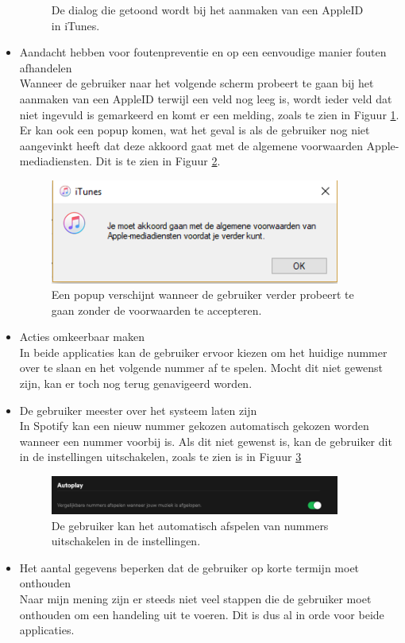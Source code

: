 \documentclass[11pt]{article}
\begin{document}
\begin{itemize}
\begin{figure}
		\caption{De dialog die getoond wordt bij het aanmaken van een AppleID in iTunes.}
		\label{fig:IAppleID}
	\end{figure}
	\item Aandacht hebben voor foutenpreventie en op een eenvoudige manier fouten afhandelen\\
	Wanneer de gebruiker naar het volgende scherm probeert te gaan bij het aanmaken van een AppleID terwijl een veld nog leeg is, wordt ieder veld dat niet ingevuld is gemarkeerd en komt er een melding, zoals te zien in Figuur \ref{fig:IAppleID}. Er kan ook een popup komen, wat het geval is als de gebruiker nog niet aangevinkt heeft dat deze akkoord gaat met de algemene voorwaarden Apple-mediadiensten. Dit is te zien in Figuur \ref{fig:IAppleIDAkkoord}.
	\begin{figure}
		\centering
		\includegraphics[width=0.9\textwidth]{IAppleIDAkkoord.png}
		\caption{Een popup verschijnt wanneer de gebruiker verder probeert te gaan zonder de voorwaarden te accepteren.}
		\label{fig:IAppleIDAkkoord}
	\end{figure}
	\item Acties omkeerbaar maken\\
	In beide applicaties kan de gebruiker ervoor kiezen om het huidige nummer over te slaan en het volgende nummer af te spelen. Mocht dit niet gewenst zijn, kan er toch nog terug genavigeerd worden.
	\item De gebruiker meester over het systeem laten zijn\\
	In Spotify kan een nieuw nummer gekozen automatisch gekozen worden wanneer een nummer voorbij is. Als dit niet gewenst is, kan de gebruiker dit in de instellingen uitschakelen, zoals te zien is in Figuur \ref{fig:SAutoplay}
	\begin{figure}
		\centering
		\includegraphics[width=0.9\textwidth]{SAutoplay.png}
		\caption{De gebruiker kan het automatisch afspelen van nummers uitschakelen in de instellingen.}
		\label{fig:SAutoplay}
	\end{figure}
	\item Het aantal gegevens beperken dat de gebruiker op korte termijn moet onthouden\\
	Naar mijn mening zijn er steeds niet veel stappen die de gebruiker moet onthouden om een handeling uit te voeren. Dit is dus al in orde voor beide applicaties.
\end{itemize}
\end{document}
